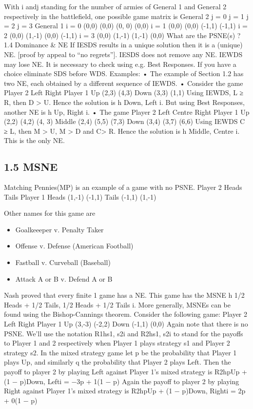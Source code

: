 With i andj standing for the number of armies of General 1 and General 2 respectively
in the battlefield, one possible game matrix is
General 2
j = 0 j = 1 j = 2 j = 3
General 1
i = 0 (0,0) (0,0) (0, 0) (0,0)
i = 1 (0,0) (0,0) (-1,1) (-1,1)
i = 2 (0,0) (1,-1) (0,0) (-1,1)
i = 3 (0,0) (1,-1) (1,-1) (0,0)
What are the PSNE(s) ?
1.4 Dominance & NE
If IESDS results in a unique solution then it is a (unique) NE. [proof by appeal to “no
regrets”]. IESDS does not remove any NE.
IEWDS may lose NE. It is necessary to check using e.g. Best Responses. If you have a
choice eliminate SDS before WDS. Examples:
• The example of Section 1.2 has two NE, each obtained by a different sequence of
IEWDS.
• Consider the game
Player 2
Left Right
Player 1 Up (2,3) (4,3)
Down (3,3) (1,1)
Using IEWDS, L ≥ R, then D > U. Hence the solution is h Down, Left i. But using
Best Responses, another NE is h Up, Right i.
• The game
Player 2
Left Centre Right
Player 1
Up (2,2) (4,2) (4, 3)
Middle (2,4) (5,5) (7,3)
Down (3,4) (3,7) (6,6)
Using IEWDS C ≥ L, then M > U, M > D and C> R. Hence the solution is
h Middle, Centre i. This is the only NE.
\subsection{1.5 MSNE}
Matching Pennies(MP) is an example of a game with no PSNE.
Player 2
Heads Tails
Player 1 Heads (1,-1) (-1,1)
Tails (-1,1) (1,-1)

Other names for this game are
\begin{itemize}
\item Goalkeeeper v. Penalty Taker
\item Offense v. Defense (American Football)
\item Fastball v. Curveball (Baseball)
\item Attack A or B v. Defend A or B
\end{itemize}
Nash proved that every finite 1 game has a NE.
This game has the MSNE h 1/2 Heads + 1/2 Tails, 1/2 Heads + 1/2 Tails i.
More generally, MSNEs can be found using the Bishop-Cannings theorem. Consider the
following game:
Player 2
Left Right
Player 1 Up (3,-3) (-2,2)
Down (-1,1) (0,0)
Again note that there is no PSNE. We’ll use the notation R1hs1, s2i and R2hs1, s2i to
stand for the payoffs to Player 1 and 2 respectively when Player 1 plays strategy s1 and
Player 2 strategy s2.
In the mixed strategy game let p be the probability that Player 1 plays Up, and similarly
q the probability that Player 2 plays Left. Then the payoff to player 2 by playing Left
against Player 1’s mixed strategy is
R2hpUp + (1 − p)Down, Lefti = −3p + 1(1 − p)
Again the payoff to player 2 by playing Right against Player 1’s mixed strategy is
R2hpUp + (1 − p)Down, Righti = 2p + 0(1 − p)

